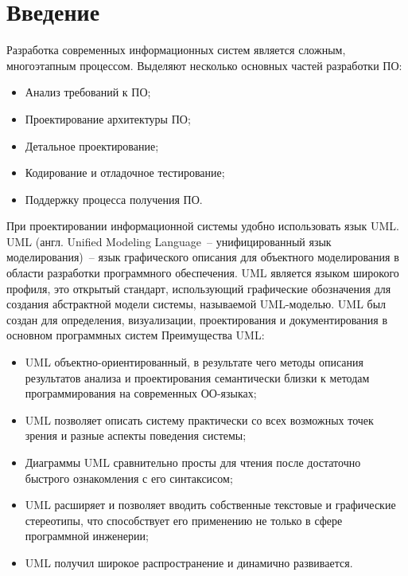 ﻿\section{Введение}
  Разработка современных информационных систем является сложным, многоэтапным процессом. 
  Выделяют несколько основных частей разработки ПО:
  \begin{itemize}
		\item Анализ требований к ПО;
		\item Проектирование архитектуры ПО;
    \item Детальное проектирование;
    \item Кодирование и отладочное тестирование;
    \item Поддержку процесса получения ПО.
  \end{itemize} 
  При проектировании информационной системы удобно использовать язык UML.
  UML (англ. Unified Modeling Language~-- унифицированный язык моделирования)~-- язык графического описания для   
объектного моделирования в области разработки программного обеспечения. UML является языком широкого профиля, это 
открытый стандарт, использующий графические обозначения для создания абстрактной модели системы, называемой 
UML-моделью. UML был создан для определения, визуализации, проектирования и документирования в основном программных систем
  Преимущества UML:
  \begin{itemize}
    \item UML объектно-ориентированный, в результате чего методы описания результатов анализа и проектирования семантически близки к методам программирования на современных ОО-языках;
    \item UML позволяет описать систему практически со всех возможных точек зрения и разные аспекты поведения системы;
    \item Диаграммы UML сравнительно просты для чтения после достаточно быстрого ознакомления с его синтаксисом;
    \item UML расширяет и позволяет вводить собственные текстовые и графические стереотипы, что способствует его применению не только в сфере программной инженерии;
    \item UML получил широкое распространение и динамично развивается.
  \end{itemize}
\newpage
\endinput


